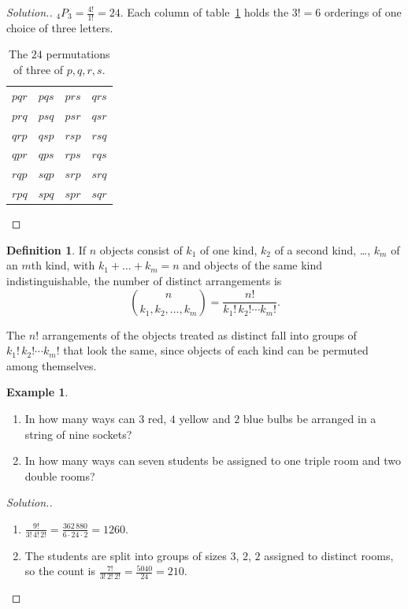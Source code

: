 \documentclass[12pt,a4paper]{report}
\theoremstyle{definition}
\newtheorem{definition}[thm]{Definition}
\newtheorem{example}[thm]{Example}
\theoremstyle{plain}
\theoremstyle{definition}
\newenvironment{solution}
  {\renewcommand{\qedsymbol}{}\begin{proof}[\textit{Solution}.]}
  {\end{proof}}
\begin{document}
\begin{solution}
${}_4P_3 = \frac{4!}{1!} = 24$. Each column of table~\ref{tab:pqrs} holds the $3! = 6$
orderings of one choice of three letters.
\begin{table}[H]
\centering
\caption{The $24$ permutations of three of $p, q, r, s$.}
\label{tab:pqrs}
\begin{tabular}{cccc}
$pqr$ & $pqs$ & $prs$ & $qrs$\\
$prq$ & $psq$ & $psr$ & $qsr$\\
$qrp$ & $qsp$ & $rsp$ & $rsq$\\
$qpr$ & $qps$ & $rps$ & $rqs$\\
$rqp$ & $sqp$ & $srp$ & $srq$\\
$rpq$ & $spq$ & $spr$ & $sqr$
\end{tabular}
\end{table}
\end{solution}

\begin{definition}
\label{def:multinomialperm}
If $n$ objects consist of $k_1$ of one kind, $k_2$ of a second kind, \dots, $k_m$ of an
$m$th kind, with $k_1 + \dots + k_m = n$ and objects of the same kind indistinguishable,
the number of distinct arrangements is
\[\binom{n}{k_1, k_2, \dots, k_m} = \frac{n!}{k_1!\,k_2!\cdots k_m!} .\]
\end{definition}

The $n!$ arrangements of the objects treated as distinct fall into groups of
$k_1!\,k_2!\cdots k_m!$ that look the same, since objects of each kind can be permuted
among themselves.

\begin{example}
\label{ex:bulbs}
\begin{enumerate}
\item[(a)] In how many ways can $3$ red, $4$ yellow and $2$ blue bulbs be arranged in a
string of nine sockets?
\item[(b)] In how many ways can seven students be assigned to one triple room and two
double rooms?
\end{enumerate}
\end{example}

\begin{solution}
\begin{enumerate}
\item[(a)] $\frac{9!}{3!\,4!\,2!} = \frac{362\,880}{6\cdot 24\cdot 2} = 1260$.
\item[(b)] The students are split into groups of sizes $3$, $2$, $2$ assigned to distinct
rooms, so the count is $\frac{7!}{3!\,2!\,2!} = \frac{5040}{24} = 210$.
\end{enumerate}
\end{solution}
\end{document}
